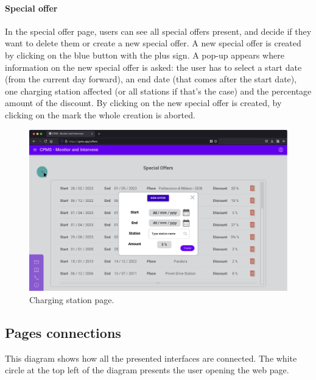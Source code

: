 \pagebreak

\paragraph{Special offer} In the special offer page, users can see all special offers present, and decide if they want to delete them or create a new special offer. A new special offer is created by clicking on the blue button with the plus sign. A pop-up appears where information on the new special offer is asked: the user has to select a start date (from the current day forward), an end date (that comes after the start date), one charging station affected (or all stations if that's the case) and the percentage amount of the discount. By clicking on  the new special offer is created, by clicking on the  mark the whole creation is aborted.

\bigskip
\bigskip
\bigskip
\bigskip

\begin{figure}[h!]
    \centering
    \includegraphics[width=\columnwidth]{./images/mockups/cpms/Offer}
    \caption{Charging station page.}
\end{figure}

\pagebreak

\subsection{Pages connections}

This diagram shows how all the presented interfaces are connected. The white circle at the top left of the diagram presents the user opening the web page.

